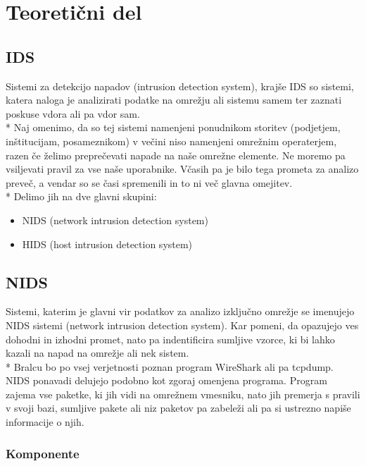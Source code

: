 \documentclass[12pt]{article}
\let\stdsection\section
\renewcommand\section{\newpage\stdsection}
\begin{document}
\section{Teoretični del}



\subsection{IDS} %
\label{ssub:IDS}


Sistemi za detekcijo napadov (intrusion detection system), krajše IDS
so sistemi, katera naloga je analizirati podatke na omrežju ali sistemu samem
ter zaznati poskuse vdora ali pa vdor sam.
\\*
Naj omenimo, da so tej sistemi namenjeni ponudnikom storitev (podjetjem, inštitucijam, posameznikom)
v večini niso namenjeni omrežnim operaterjem, razen če želimo preprečevati napade na naše omrežne elemente. 
Ne moremo pa vsiljevati pravil za vse naše uporabnike. Včasih pa je bilo tega prometa za analizo preveč, a vendar
so se časi spremenili in to ni več glavna omejitev.
\\*
Delimo jih na dve glavni skupini:

\begin{itemize}
    \item NIDS (network intrusion detection system)
    \item HIDS (host intrusion detection system)
\end{itemize}


\subsection{NIDS}

Sistemi, katerim je glavni vir podatkov za analizo izključno omrežje se imenujejo NIDS sistemi (network intrusion detection system).
Kar pomeni, da opazujejo ves dohodni in izhodni promet, nato pa indentificira sumljive vzorce, ki bi lahko kazali na napad na omrežje ali nek sistem.
\\*
Bralcu bo po vsej verjetnosti poznan program WireShark ali pa tcpdump.
NIDS ponavadi delujejo podobno kot zgoraj omenjena programa. Program zajema vse paketke, ki jih vidi na omrežnem vmesniku,
nato jih premerja s pravili v svoji bazi, sumljive pakete ali niz paketov pa zabeleži ali pa si ustrezno napiše informacije o njih.

\subsubsection{Komponente} %
\end{document}
